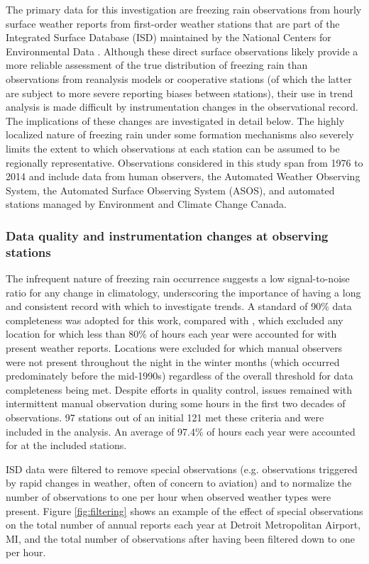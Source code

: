 \documentclass[twocol]{ametsoc}
\begin{document}
The primary data for this investigation are freezing rain observations from hourly surface weather reports from first-order weather stations that are part of the Integrated Surface Database (ISD) maintained by the National Centers for Environmental Data \citep{smith2011integrated}. Although these direct surface observations likely provide a more reliable assessment of the true distribution of freezing rain than observations from reanalysis models or cooperative stations (of which the latter are subject to more severe reporting biases between stations), their use in trend analysis is made difficult by instrumentation changes in the observational record. The implications of these changes are investigated in detail below. The highly localized nature of freezing rain under some formation mechanisms also severely limits the extent to which observations at each station can be assumed to be regionally representative. Observations considered in this study span from 1976 to 2014 and include data from human observers, the Automated Weather Observing System, the Automated Surface Observing System (ASOS), and automated stations managed by Environment and Climate Change Canada.

\subsubsection{Data quality and instrumentation changes at observing stations}
The infrequent nature of freezing rain occurrence suggests a low signal-to-noise ratio for any change in climatology, underscoring the importance of having a long and consistent record with which to investigate trends. A standard of 90\% data completeness was adopted for this work, compared with \citet{cortinas2000climatology}, which excluded any location for which less than 80\% of hours each year were accounted for with present weather reports. Locations were excluded for which manual observers were not present throughout the night in the winter months (which occurred predominately before the mid-1990s) regardless of the overall threshold for data completeness being met. Despite efforts in quality control, issues remained with intermittent manual observation during some hours in the first two decades of observations. 97 stations out of an initial 121 met these criteria and were included in the analysis. An average of 97.4\% of hours each year were accounted for at the included stations.

ISD data were filtered to remove special observations (e.g. observations triggered by rapid changes in weather, often of concern to aviation) and to normalize the number of observations to one per hour when observed weather types were present. Figure \ref{fig:filtering} shows an example of the effect of special observations on the total number of annual reports each year at Detroit Metropolitan Airport, MI, and the total number of observations after having been filtered down to one per hour.
\end{document}
